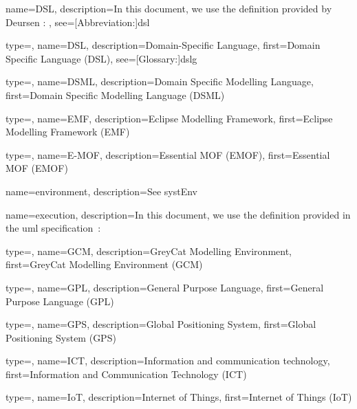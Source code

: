 {
	name={DSL},
	description={In this document, we use the definition provided by Deursen \etal \cite{DBLP:journals/sigplan/DeursenKV00}: },
	see=[Abbreviation:]{dsl}
}

{
	type=\acronymtype,
	name={DSL},
	description={Domain-Specific Language},
	first={Domain Specific Language (DSL)},
	see=[Glossary:]{dslg}
}

{
	type=\acronymtype,
	name={DSML},
	description={Domain Specific Modelling Language},
	first={Domain Specific Modelling Language (DSML)}
}

{
	type=\acronymtype,
	name={EMF},
	description={Eclipse Modelling Framework},
	first={Eclipse Modelling Framework (EMF)}
}

{
	type=\acronymtype,
	name={E-MOF},
	description={Essential MOF (EMOF)},
	first={Essential MOF (EMOF)}
}

{
	name={envi\-ron\-ment},
	description={See \gls{systEnv}}
}

{
	name={exe\-cu\-tion},
	description={In this document, we use the definition provided in the \gls{uml} specification~\cite{omg2017umlspec}: }
}

{
	type=\acronymtype,
	name={GCM},
	description={GreyCat Modelling Environment},
	first={GreyCat Modelling Environment (GCM)}
}

{
	type=\acronymtype,
	name={GPL},
	description={General Purpose Language},
	first={General Purpose Language (GPL)}
}

{
	type=\acronymtype,
	name={GPS},
	description={Global Positioning System},
	first={Global Positioning System (GPS)}
}

{
	type=\acronymtype,
	name={ICT},
	description={Information and communication technology},
	first={Information and Communication Technology (ICT)}
}

{
	type=\acronymtype,
	name={IoT},
	description={Internet of Things},
	first={Internet of Things (IoT)}
}

